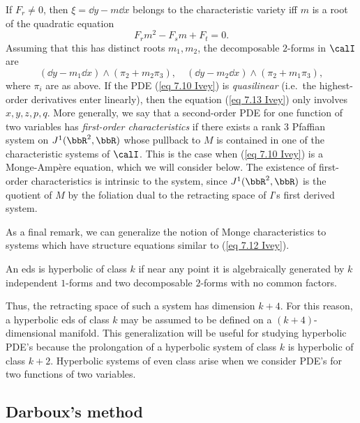 \begin{rem}
    If $F_r\neq 0$, then $\xi=\dd y-m\dd x$ belongs to the characteristic variety iff $m$ is a root of the quadratic equation 
    \[F_rm^2-F_sm+F_t=0.\label{eq 7.13 Ivey}\]
    Assuming that this has distinct roots $m_1,m_2$, the decomposable $2$-forms in $\calI$ are 
    \[(\dd y-m_1\dd x)\wedge (\pi_2+m_2\pi_3),\quad (\dd y-m_2\dd x)\wedge (\pi_2+m_1\pi_3),\]
    where $\pi_i$ are as above.
    If the PDE (\ref{eq 7.10 Ivey}) is \emph{quasilinear} (i.e.\ the highest-order derivatives enter linearly), then the equation (\ref{eq 7.13 Ivey}) only involves $x,y,z,p,q$. More generally, we say that a second-order PDE for one function of two variables has \emph{first-order characteristics} if there exists a rank $3$ Pfaffian system on $J^1(\bbR^2,\bbR)$ whose pullback to $M$ is contained in one of the characteristic systems of $\calI$. This is the case when (\ref{eq 7.10 Ivey}) is a Monge-Amp\`ere equation, which we will consider below. The existence of first-order characteristics is intrinsic to the system, since $J^1(\bbR^2,\bbR)$ is the quotient of $M$ by the foliation dual to the retracting space of $I$'s first derived system.
\end{rem}
As a final remark, we can generalize the notion of Monge characteristics to systems which have structure equations similar to (\ref{eq 7.12 Ivey}).

\begin{defn}
    An \gls{eds} is hyperbolic of class $k$ if near any point it is algebraically generated by $k$ independent $1$-forms and two decomposable $2$-forms with no common factors.
\end{defn}

Thus, the retracting space of such a system has dimension $k+4$. For this reason, a hyperbolic \gls{eds} of class $k$ may be assumed to be defined on a $(k+4)$-dimensional manifold. This generalization will be useful for studying hyperbolic PDE's because the prolongation of a hyperbolic system of class $k$ is hyperbolic of class $k+2$. Hyperbolic systems of even class arise when we consider PDE's for two functions of two variables.









\subsection{Darboux's method}

